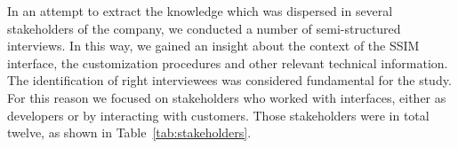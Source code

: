 %

 In an attempt to extract the knowledge which was dispersed in several stakeholders of the company, we conducted a number of semi-structured interviews. In this way, we gained an insight about the context of the SSIM interface, the customization procedures and other relevant technical information. The identification of right interviewees was considered fundamental for the study. %
For this reason we focused on stakeholders who worked with interfaces, either as developers or by interacting with customers. %
Those stakeholders were in total twelve, as shown in Table~\ref{tab:stakeholders}. 

